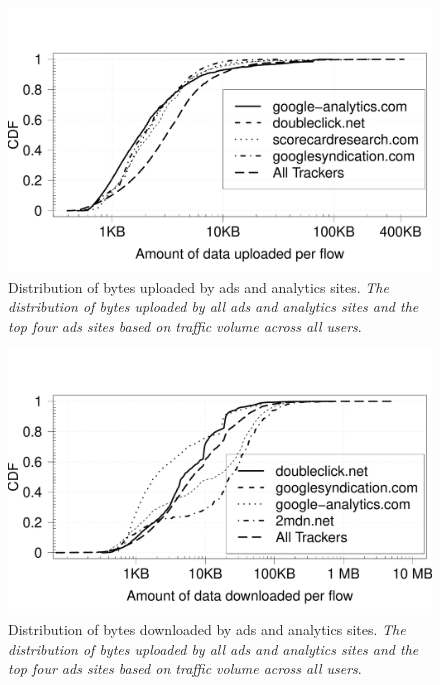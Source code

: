 \begin{figure}[t]
\includegraphics[width=\columnwidth]{plots/distrib_ad_uploads.pdf}
\caption{Distribution of bytes uploaded by ads and analytics sites. \emph{The distribution of bytes uploaded by all ads and analytics sites and the top four ads sites based on traffic volume across all users}.}
\label{fig:description}
\end{figure}

\begin{figure}[t]
\includegraphics[width=\columnwidth]{plots/distrib_ad_downloads.pdf}
\caption{Distribution of bytes downloaded by ads and analytics sites. \emph{The distribution of bytes uploaded by all ads and analytics sites and the top four ads sites based on traffic volume across all users}.}
\label{fig:description}
\end{figure}

